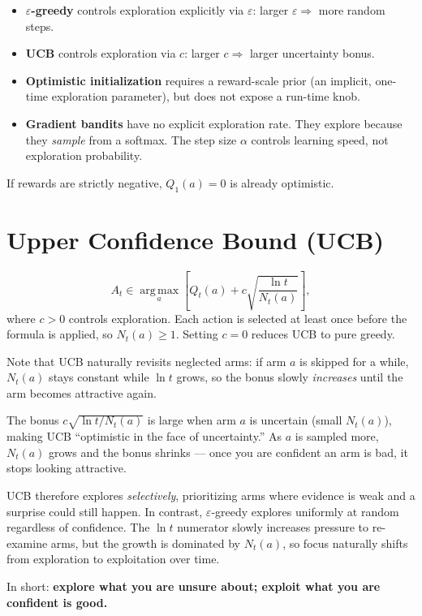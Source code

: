 \documentclass[11pt, oneside]{book}
\newcommand{\argmax}{\operatorname*{arg\,max}}
\begin{document}
\begin{notebox}[title={Exam Nuances: Exploration Hyperparameters}]
\begin{itemize}
  \item \textbf{$\varepsilon$-greedy} controls exploration explicitly via
    $\varepsilon$: larger $\varepsilon \Rightarrow$ more random steps.
  \item \textbf{UCB} controls exploration via $c$: larger $c \Rightarrow$
    larger uncertainty bonus.
  \item \textbf{Optimistic initialization} requires a reward-scale prior
    (an implicit, one-time exploration parameter), but does not expose a
    run-time knob.
  \item \textbf{Gradient bandits} have no explicit exploration rate. They
    explore because they \emph{sample} from a softmax. The step size
    $\alpha$ controls learning speed, not exploration probability.
\end{itemize}
If rewards are strictly negative, $Q_1(a) = 0$ is already optimistic.
\end{notebox}

\section{Upper Confidence Bound (UCB)}

\begin{thmbox}[title={UCB Action Selection}]
\[
  A_t \in \argmax_a \left[Q_t(a) + c\sqrt{\frac{\ln t}{N_t(a)}}\right],
\]
where $c > 0$ controls exploration. Each action is selected at least once
before the formula is applied, so $N_t(a) \ge 1$.
Setting $c = 0$ reduces UCB to pure greedy.
\end{thmbox}

Note that UCB naturally revisits neglected arms: if arm $a$ is skipped for
a while, $N_t(a)$ stays constant while $\ln t$ grows, so the bonus slowly
\emph{increases} until the arm becomes attractive again.

\begin{intbox}[title={Why the UCB Bonus Works}]
The bonus $c\sqrt{\ln t / N_t(a)}$ is large when arm $a$ is uncertain (small
$N_t(a)$), making UCB ``optimistic in the face of uncertainty.'' As $a$ is
sampled more, $N_t(a)$ grows and the bonus shrinks --- once you are confident
an arm is bad, it stops looking attractive.

UCB therefore explores \emph{selectively}, prioritizing arms where evidence
is weak and a surprise could still happen. In contrast, $\varepsilon$-greedy
explores uniformly at random regardless of confidence. The $\ln t$ numerator
slowly increases pressure to re-examine arms, but the growth is dominated by
$N_t(a)$, so focus naturally shifts from exploration to exploitation over
time.

In short: \textbf{explore what you are unsure about; exploit what you are
confident is good.}
\end{intbox}
\end{document}
